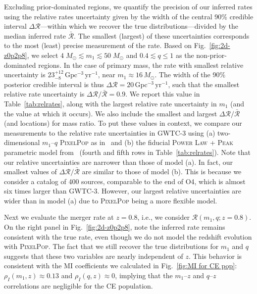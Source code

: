 \documentclass[twocolumn, twocolappendix]{aastex631}
\newcommand{\ztwo}{0.8}
\newcommand{\Msun}{M_\odot}
\newcommand{\rateunit}
{\mathrm{Gpc^{-3}\,yr^{-1}}}
\newcommand{\relrate}{\Delta\mathcal{R}/\bar{\mathcal{R}}}
\newcommand{\PixelPop}{\textsc{PixelPop}\xspace}
\begin{document}
Excluding prior-dominated regions, we quantify the precision of our inferred rates using the relative rates uncertainty given by the width of the central 90\% credible interval $\Delta\mathcal{R}$---within which we recover the true distributions---divided by the median inferred rate $\bar{\mathcal{R}}$. The smallest (largest) of these uncertainties corresponds to the most (least) precise measurement of the rate. Based on Fig.~\ref{fig:2d-z0p2p8}, we select $4\;\Msun \lesssim m_1 \lesssim 50 \;\Msun$ and $0.4 \lesssim q \leq 1$ as the non-prior-dominated regions. In the case of primary mass, the rate with smallest relative uncertainty is $23^{+12}_{-8}\,\rateunit$, near $m_1\approx16\,\Msun$. The width of the 90\% posterior credible interval is thus $\Delta\mathcal{R}=20\,\rateunit$, such that the smallest relative rate uncertainty is $\relrate=0.9$. We report this value in Table~\ref{tab:relrates}, along with the largest relative rate uncertainty in $m_1$ (and the value at which it occurs). We also include the smallest and largest $\relrate$ (and locations) for mass ratio. To put these values in context, we compare our measurements to the relative rate uncertainties in \acs{GWTC-3} using (a) two-dimensional $m_1$--$q$ \PixelPop as in~\citet{Heinzel:2024hva} and (b) the fiducial \textsc{Power Law + Peak} parametric model from~\citet{KAGRA:2021duu} (fourth and fifth rows in Table~\ref{tab:relrates}). Note that our relative uncertainties are narrower than those of model (a). In fact, our smallest values of $\relrate$ are similar to those of model (b). This is because we consider a catalog of 400 sources, comparable to the end of \ac{O4}, which is almost six times larger than \acs{GWTC-3}. However, our largest relative uncertainties are wider than in model (a) due to \PixelPop being a more flexible model.

Next we evaluate the merger rate at $z=\ztwo$, i.e., we consider $\mathcal{R}(m_1,q;z=\ztwo)$. On the right panel in Fig.~\ref{fig:2d-z0p2p8}, note the inferred rate remains consistent with the true rate, even though we do not model the redshift evolution with \PixelPop. The fact that we still recover the true distributions for $m_1$ and $q$ suggests that these two variables are nearly independent of $z$. This behavior is consistent with the \ac{MI} coefficients we calculated in Fig.~\ref{fig:MI for CE pop}: $\rho_I(m_1,z) \approx 0.13$ and $\rho_I(q,z) \approx 0$, implying that the $m_1$--$z$ and $q$--$z$ correlations are negligible for the \ac{CE} population.
\end{document}
